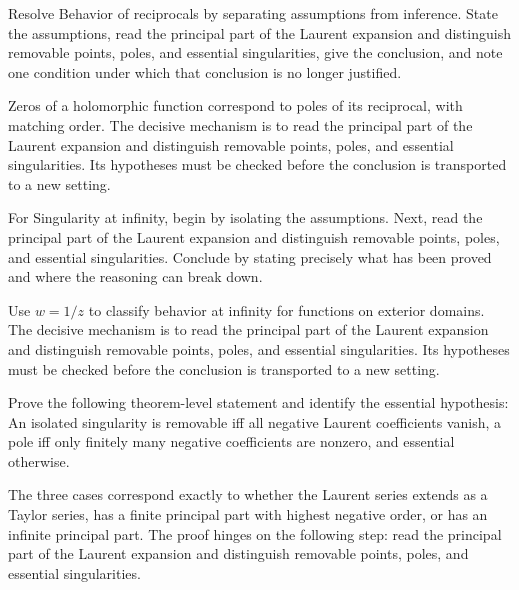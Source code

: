 \begin{problem}\label{prob:iv09-problem-07}
Resolve Behavior of reciprocals by separating assumptions from inference. State the assumptions, read the principal part of the Laurent expansion and distinguish removable points, poles, and essential singularities, give the conclusion, and note one condition under which that conclusion is no longer justified.
\end{problem}
\begin{solution}
Zeros of a holomorphic function correspond to poles of its reciprocal, with matching order. The decisive mechanism is to read the principal part of the Laurent expansion and distinguish removable points, poles, and essential singularities. Its hypotheses must be checked before the conclusion is transported to a new setting.
\end{solution}

\begin{problem}\label{prob:iv09-problem-08}
For Singularity at infinity, begin by isolating the assumptions. Next, read the principal part of the Laurent expansion and distinguish removable points, poles, and essential singularities. Conclude by stating precisely what has been proved and where the reasoning can break down.
\end{problem}
\begin{solution}
Use $w=1/z$ to classify behavior at infinity for functions on exterior domains. The decisive mechanism is to read the principal part of the Laurent expansion and distinguish removable points, poles, and essential singularities. Its hypotheses must be checked before the conclusion is transported to a new setting.
\end{solution}

\begin{problem}\label{prob:iv09-problem-09}
Prove the following theorem-level statement and identify the essential hypothesis: An isolated singularity is removable iff all negative Laurent coefficients vanish, a pole iff only finitely many negative coefficients are nonzero, and essential otherwise.
\end{problem}
\begin{solution}
The three cases correspond exactly to whether the Laurent series extends as a Taylor series, has a finite principal part with highest negative order, or has an infinite principal part. The proof hinges on the following step: read the principal part of the Laurent expansion and distinguish removable points, poles, and essential singularities.
\end{solution}

